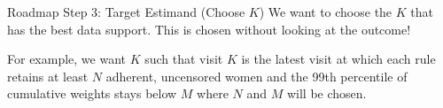 \documentclass[11pt, xcolor={dvipsnames}, usepdftitle=false]{beamer}
\begin{document}
\begin{frame}{Roadmap Step 3: Target Estimand (Choose $K$)}
We want to choose the $K$ that has the best data support. This is chosen without looking at the outcome!

\hfill

For example, we want $K$ such that visit $K$ is the latest visit at which each rule retains at least $N$ adherent, uncensored women and the 99th percentile of cumulative weights stays below $M$ where $N$ and $M$ will be chosen.


\end{frame}
\end{document}
